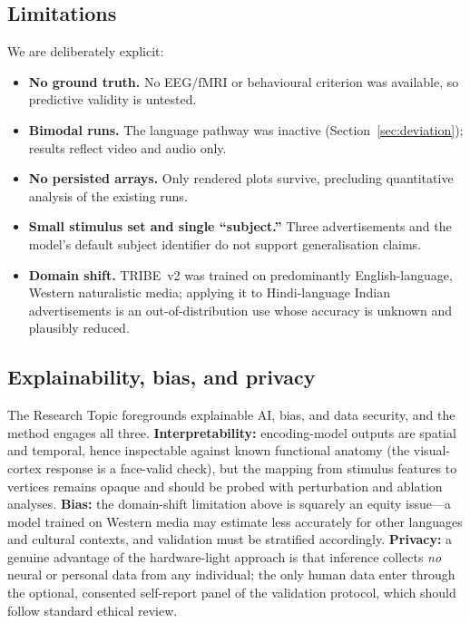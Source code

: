 \documentclass[11pt]{article}
\begin{document}
\subsection{Limitations}
We are deliberately explicit:
\begin{itemize}[leftmargin=1.4em,itemsep=0.12em,topsep=0.2em]
  \item \textbf{No ground truth.} No EEG/fMRI or behavioural criterion was
  available, so predictive validity is untested.
  \item \textbf{Bimodal runs.} The language pathway was inactive
  (Section~\ref{sec:deviation}); results reflect video and audio only.
  \item \textbf{No persisted arrays.} Only rendered plots survive, precluding
  quantitative analysis of the existing runs.
  \item \textbf{Small stimulus set and single ``subject.''} Three
  advertisements and the model's default subject identifier do not support
  generalisation claims.
  \item \textbf{Domain shift.} TRIBE~v2 was trained on predominantly
  English-language, Western naturalistic media; applying it to Hindi-language
  Indian advertisements is an out-of-distribution use whose accuracy is
  unknown and plausibly reduced.
\end{itemize}

\subsection{Explainability, bias, and privacy}
\label{sec:ethics}
The Research Topic foregrounds explainable AI, bias, and data security, and the
method engages all three. \textbf{Interpretability:} encoding-model outputs are
spatial and temporal, hence inspectable against known functional anatomy (the
visual-cortex response is a face-valid check), but the mapping from stimulus
features to vertices remains opaque and should be probed with perturbation and
ablation analyses. \textbf{Bias:} the domain-shift limitation above is
squarely an equity issue---a model trained on Western media may estimate less
accurately for other languages and cultural contexts, and validation must be
stratified accordingly. \textbf{Privacy:} a genuine advantage of the
hardware-light approach is that inference collects \emph{no} neural or personal
data from any individual; the only human data enter through the optional,
consented self-report panel of the validation protocol, which should follow
standard ethical review.
\end{document}

